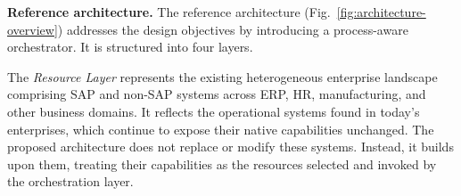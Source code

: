 \documentclass[10pt,twocolumn]{article}
\begin{document}


\textbf{Reference architecture.} The reference architecture (Fig.~\ref{fig:architecture-overview}) addresses the design objectives by introducing a process-aware orchestrator. It is structured into four layers.

The \emph{Resource Layer} represents the existing heterogeneous enterprise landscape comprising SAP and non-SAP systems across ERP, HR, manufacturing, and other business domains. It reflects the operational systems found in today's enterprises, which continue to expose their native capabilities unchanged. The proposed architecture does not replace or modify these systems. Instead, it builds upon them, treating their capabilities as the resources selected and invoked by the orchestration layer.
\end{document}
